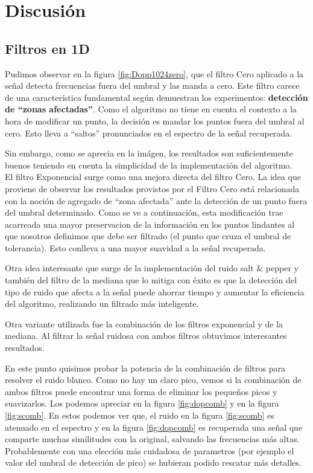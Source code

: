 \section{Discusi\'on}

\subsection{Filtros en 1D}

Pudimos observar en la figura \ref{fig:Dopp1024zero}, que el filtro Cero
aplicado a la se\~nal detecta frecuencias fuera del umbral y
las manda a cero. Este filtro carece de una caracter\'istica fundamental
seg\'un demuestran los experimentos:
{\bf detecci\'on de ``zonas afectadas''}. Como el algoritmo no tiene en
cuenta el contexto a la hora de modificar un punto, la decisi\'on es mandar los
puntos fuera del umbral al cero. Esto lleva a ``saltos'' pronunciados en
el espectro de la se\~nal recuperada.

Sin embargo, como se aprecia en la im\'agen, los resultados son suficientemente
buenos teniendo en cuenta la simplicidad de la implementaci\'on del algoritmo.\\

El filtro Exponencial surge como una mejora directa del filtro Cero.
La idea que proviene de observar los resultados provistos por el Filtro Cero est\'a relacionada con la
noci\'on de agregado de ``zona afectada'' ante la detecci\'on de un punto fuera
del umbral determinado. Como se ve a continuaci\'on, esta modificaci\'on trae
acarreada una mayor preservacion de la informaci\'on en los puntos lindantes al que nosotros
definimos que debe ser filtrado (el punto que cruza el umbral de tolerancia). Esto conlleva 
a una mayor suavidad a la se\~nal recuperada.

Otra idea interesante que surge de la implementaci\'on del ruido salt & pepper y tambi\'en del
filtro de la mediana que lo mitiga con \'exito es que la detecci\'on del tipo de ruido que afecta
a la se\~nal puede ahorrar tiempo y aumentar la eficiencia del algoritmo, realizando un filtrado m\'as
inteligente.


Otra variante utilizada fue la combinaci\'on de los filtros exponencial y
de la mediana. Al filtrar la se\~nal ruidosa con ambos filtros obtuvimos interesantes
resultados.

En este punto quisimos probar la potencia de la combinaci\'on de filtros para resolver
el ruido blanco. Como no hay un claro pico, vemos si la combinaci\'on de ambos
filtros puede encontrar una forma de eliminar los peque\~nos picos y suavizarlos.
Los podemos apreciar en la figura \ref{fig:dopcomb} y en la figura \ref{fig:scomb}.
En estos podemos ver que, el ruido en la figura \ref{fig:scomb} es atenuado
en el espectro y en la figura \ref{fig:dopcomb} es recuperada una se\~nal que
comparte muchas similitudes con la original, salvando las frecuencias
m\'as altas. Probablemente con una elecci\'on m\'as cuidadosa de parametros (por ejemplo
el valor del umbral de detecci\'on de pico) se hubieran podido rescatar m\'as detalles.


